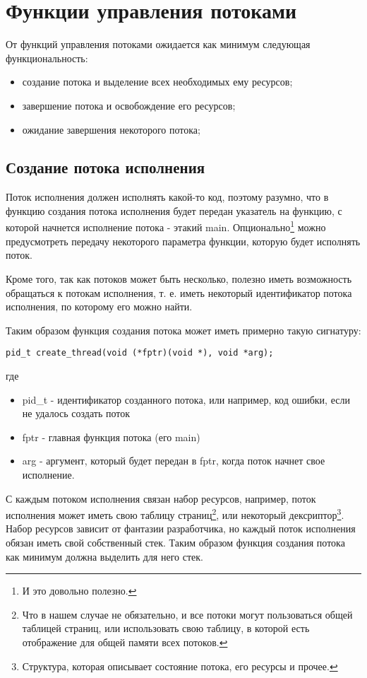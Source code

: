 \section{Функции управления потоками}

От функций управления потоками ожидается как минимум следующая функциональность:
\begin{itemize}
  \item создание потока и выделение всех необходимых ему ресурсов;
  \item завершение потока и освобождение его ресурсов;
  \item ожидание завершения некоторого потока;
\end{itemize}

\subsection{Создание потока исполнения}

Поток исполнения должен исполнять какой-то код, поэтому разумно, что в функцию
создания потока исполнения будет передан указатель на функцию, с которой
начнется исполнение потока - этакий main. Опционально\footnote{И это довольно
полезно.} можно предусмотреть передачу некоторого параметра функции, которую
будет исполнять поток.

Кроме того, так как потоков может быть несколько, полезно иметь возможность
обращаться к потокам исполнения, т. е. иметь некоторый идентификатор потока
исполнения, по которому его можно найти.

Таким образом функция создания потока может иметь примерно такую сигнатуру:

\begin{verbatim}
pid_t create_thread(void (*fptr)(void *), void *arg);
\end{verbatim}

где
\begin{itemize}
  \item pid\_t - идентификатор созданного потока, или например, код ошибки, если
        не удалось создать поток
  \item fptr - главная функция потока (его main)
  \item arg - аргумент, который будет передан в fptr, когда поток начнет свое
        исполнение.
\end{itemize}

С каждым потоком исполнения связан набор ресурсов, например, поток исполнения
может иметь свою таблицу страниц\footnote{Что в нашем случае не обязательно, и
все потоки могут пользоваться общей таблицей страниц, или использовать свою
таблицу, в которой есть отображение для общей памяти всех потоков.}, или
некоторый дексриптор\footnote{Структура, которая описывает состояние потока, его
ресурсы и прочее.}. Набор ресурсов зависит от фантазии разработчика, но каждый
поток исполнения обязан иметь свой собственный стек. Таким образом функция
создания потока как минимум должна выделить для него стек.

